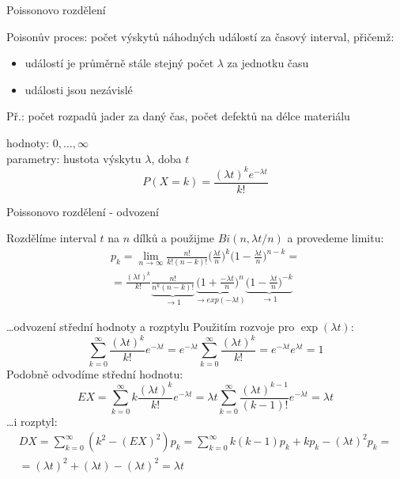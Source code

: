 \documentclass[smaller]{beamer}
\def\to{\rightarrow}
\def\xskip{{\vspace{2ex}}}
\begin{document}
\begin{frame}{Poissonovo rozdělení}

{\df Poisonův proces}: počet výskytů náhodných událostí za časový interval, přičemž:
\begin{itemize}
 \item událostí je průměrně stále stejný počet $\lambda$ za jednotku času
 \item události jsou nezávislé
\end{itemize}
Př.: počet rozpadů jader za daný čas, počet defektů na délce materiálu

\xskip
hodnoty: $0,\dots,\infty$\\
parametry: hustota výskytu $\lambda$, doba $t$
\[
 P(X=k) = \frac{(\lambda t)^k e^{-\lambda t}}{k!}
\]
\end{frame}

\begin{frame}{Poissonovo rozdělení - odvození}

Rozdělíme interval $t$ na $n$ dílků a použijme $Bi(n, \lambda t/n)$ a provedeme limitu:
\begin{multline*}
 p_k = \lim_{n\to\infty} \frac{n!}{k!(n-k)!}\Big(\frac{\lambda t}{n}\Big)^k\Big(1-\frac{\lambda t}{n}\Big)^{n-k} =\\
 =\frac{(\lambda t)^k}{k!}\underbrace{\frac{n!}{n^k(n-k)!}}_{\to 1} \underbrace{\Big(1+\frac{-\lambda t}{n}\Big)^n}_{\to exp(-\lambda t)}
  \underbrace{\Big(1-\frac{\lambda t}{n}\Big)^{-k}}_{\to 1} 
\end{multline*}
\end{frame}

\begin{frame}{\dots odvození střední hodnoty a rozptylu}
Použitím rozvoje pro $\exp(\lambda t)$:
\[
  \sum_{k=0}^{\infty} \frac{(\lambda t)^k}{k!} e^{-\lambda t} = e^{-\lambda t} \sum_{k=0}^{\infty} \frac{(\lambda t)^k}{k!}  = e^{-\lambda t} e^{\lambda t} = 1
\]
Podobně odvodíme střední hodnotu:
\[
EX = \sum_{k=0}^{\infty} k \frac{(\lambda t)^k}{k!} e^{-\lambda t} =  \lambda t \sum_{k=0}^{\infty} \frac{(\lambda t)^{k-1}}{(k-1)!} e^{-\lambda t}=\lambda t
\]
\dots i rozptyl:
\begin{multline*}
DX = \sum_{k=0}^{\infty} (k^2 - (EX)^2)p_k = \sum_{k=0}^{\infty} k(k-1)p_k + kp_k - (\lambda t)^2 p_k = \\
=(\lambda t)^2 +(\lambda t) - (\lambda t)^2 = \lambda t 
\end{multline*}
  
\end{frame}
\end{document}
